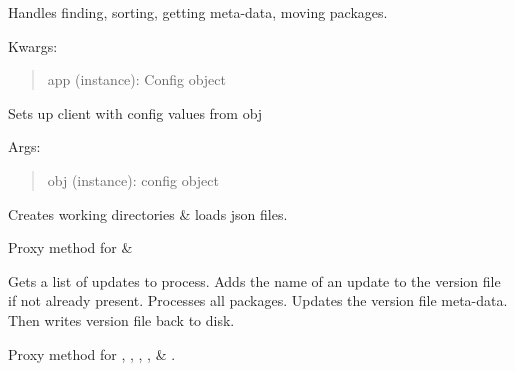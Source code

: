 \documentclass[letterpaper,10pt,english]{sphinxmanual}
\begin{document}
\begin{fulllineitems}
\label{api:pyi_updater.package_handler.PackageHandler}
Handles finding, sorting, getting meta-data, moving packages.

Kwargs:
\begin{quote}

app (instance): Config object
\end{quote}

\begin{fulllineitems}
\label{api:pyi_updater.package_handler.PackageHandler.init_app}
Sets up client with config values from obj

Args:
\begin{quote}

obj (instance): config object
\end{quote}

\end{fulllineitems}


\begin{fulllineitems}
\label{api:pyi_updater.package_handler.PackageHandler.setup}
Creates working directories \& loads json files.

Proxy method for  \& 

\end{fulllineitems}


\begin{fulllineitems}
\label{api:pyi_updater.package_handler.PackageHandler.process_packages}
Gets a list of updates to process.  Adds the name of an
update to the version file if not already present.  Processes
all packages.  Updates the version file meta-data. Then writes
version file back to disk.

Proxy method for ,
, ,
,
 \& .

\end{fulllineitems}


\end{fulllineitems}
\end{document}
